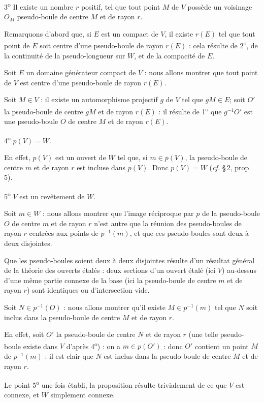 \documentclass[11pt]{article}
\newcommand{\bzcf}[2]{#1}
\newenvironment{proof}[1][]{\par}{\par}
\begin{document}
\begin{proof}
3\textsuperscript{o} Il existe un nombre $r$ positif, tel que tout point $M$ de $V$ possède un
voisinage $O_M$ pseudo-boule de centre $M$ et de rayon $r$.

Remarquons d'abord que, si $E$ est un compact de $V$, il existe $r(E)$ tel que tout point de $E$
soit centre d'une pseudo-boule de rayon $r(E)$ : cela résulte de 2\textsuperscript{o}, de la
continuité de la pseudo-longueur sur $W$, et de la compacité de $E$.

Soit $E$ un domaine générateur compact de $V$ : nous allons montrer que tout point de $V$ est
centre d'une pseudo-boule de rayon $r(E)$.

Soit $M\in V$ : il existe un automorphisme projectif $g$ de $V$ tel que $gM\in E$; soit $O'$ la
pseudo-boule de centre $gM$ et de rayon $r(E)$ : il résulte de 1\textsuperscript{o} que
$g^{-1}O'$ est une pseudo-boule $O$ de centre $M$ et de rayon $r(E)$.

4\textsuperscript{o} $p(V)=W$.

En effet, $p(V)$ est un ouvert de $W$ tel que, si $m\in p(V)$, la pseudo-boule de centre $m$ et de
rayon $r$ est incluse dans $p(V)$. Donc $p(V)=W$ (\bzcf{\textit{cf.} \S\,2, prop.
5}{\ref{bzprop:c2s2p5_ouvert_plein}}).

5\textsuperscript{o} $V$ est un revêtement de $W$.

Soit $m\in W$ : nous allons montrer que l'image réciproque par $p$ de la pseudo-boule $O$ de
centre $m$ et de rayon $r$ n'est autre que la réunion des pseudo-boules de rayon $r$ centrées aux
points de $p^{-1}(m)$, et que ces pseudo-boules sont deux à deux disjointes.

Que les pseudo-boules soient deux à deux disjointes résulte d'un résultat
général de la théorie des ouverts étalés : deux sections d'un ouvert étalé (ici $V$) au-dessus
d'une même partie connexe de la base (ici la pseudo-boule de centre $m$ et de rayon $r$) sont
identiques ou d'intersection vide.

Soit $N\in p^{-1}(O)$ : nous allons montrer qu'il existe $M\in p^{-1}(m)$ tel que $N$ soit inclus
dans la pseudo-boule de centre $M$ et de rayon $r$.

En effet, soit $O'$ la pseudo-boule de centre $N$ et de rayon $r$ (une telle pseudo-boule existe
dans $V$ d'après 4\textsuperscript{o}) : on a $m\in p(O')$ : donc $O'$ contient un point $M$ de
$p^{-1}(m)$ : il est clair que $N$ est inclus dans la pseudo-boule de centre $M$ et de rayon $r$.

Le point 5\textsuperscript{o} une fois établi, la proposition résulte trivialement de ce que $V$
est connexe, et $W$ simplement connexe.
\end{proof}

\end{document}
